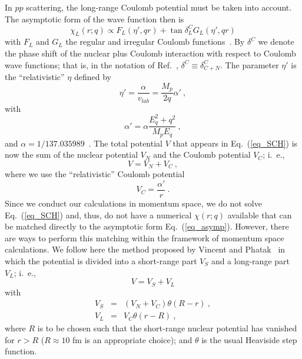 In $pp$ scattering, the long-range Coulomb potential must be taken into
account. The asymptotic form of the wave function then is
\begin{equation}
\chi_L(r;q) \propto
F_L (\eta',qr) + \tan \delta^C_L G_L(\eta',qr)
\label{eq_asymp}
\end{equation}
with $F_L$ and $G_L$ the regular and irregular
Coulomb functions~\cite{AS70}.
By $\delta^C$ we denote the phase shift of the nuclear plus
Coulomb interaction with respect to Coulomb wave functions; 
that is, in the notation of Ref.~\cite{Ber88}, 
$\delta^C \equiv \delta^C_{C+N}$.
The parameter $\eta'$ is the 
``relativistic'' $\eta$ defined by~\cite{Bre55,AS83,Ber88}
\begin{equation}
\eta' = \frac{\alpha}{v_{lab}} 
     = \frac{M_p}{2q} \alpha'
\: ,
\end{equation}
with 
\begin{equation}
\alpha' = \alpha \frac{E_q^2 + q^2}{M_p E_q}
\: ,
\end{equation}
and $\alpha = 1/137.035989$~\cite{PDG98}.
The total potential $V$ that appears in Eq.~(\ref{eq_SCH})
is now the sum of the nuclear potential $V_N$ and the Coulomb
potential $V_{C}$; i.~e.,
\begin{equation}
V=V_N+V_{C} \: ,
\end{equation}
where we use the ``relativistic'' Coulomb potential~\cite{AS83}
\begin{equation}
V_{C} = \frac{\alpha'}{r} \: .
\end{equation}
Since we conduct our calculations in momentum space,
we do not solve Eq.~(\ref{eq_SCH}) and, thus, do not have 
a numerical $\chi(r;q)$
available that can be matched directly to
the asymptotic form Eq.~(\ref{eq_asymp}).
However, there are ways to perform this matching
within the framework of momentum space calculations.
We follow here the method proposed by Vincent and Phatak~\cite{VP74}
in which the potential is divided into a short-range part $V_S$ 
and a long-range part $V_L$; i.~e.,
\begin{equation}
V = V_S + V_L
\end{equation}
with
\begin{eqnarray}
V_S & = & (V_N + V_{C}) \theta(R-r) \: ,\\
V_L & = &  V_{C} \theta(r-R) \: ,
\end{eqnarray}
where $R$ is to be chosen such that the short-range nuclear
potential has vanished for $r>R$ ($R\approx 10$ fm is an appropriate
choice); and $\theta$ is the usual Heaviside step function.
